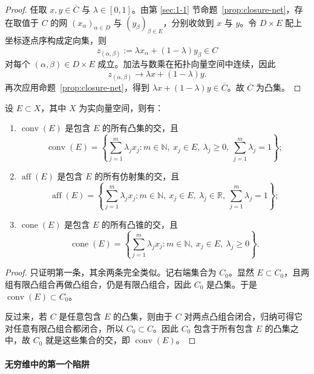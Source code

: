 \begin{proof}
任取 $x,y\in \overline{C}$ 与 $\lambda\in[0,1]$。由第 \ref{sec:1-1} 节命题~\ref{prop:closure-net}，存在取值于 $C$ 的网 $(x_\alpha)_{\alpha\in D}$ 与 $(y_\beta)_{\beta\in E}$，分别收敛到 $x$ 与 $y$。令 $D\times E$ 配上坐标逐点序构成定向集，则
\[
z_{(\alpha,\beta)}:=\lambda x_\alpha+(1-\lambda)y_\beta\in C
\]
对每个 $(\alpha,\beta)\in D\times E$ 成立。加法与数乘在拓扑向量空间中连续，因此
\[
z_{(\alpha,\beta)}\to \lambda x+(1-\lambda)y.
\]
再次应用命题~\ref{prop:closure-net}，得到 $\lambda x+(1-\lambda)y\in \overline{C}$。故 $\overline{C}$ 为凸集。
\end{proof}

\begin{proposition}[凸包与仿射包的基本性质]\label{prop:convex-hull-properties}
设 $E\subset X$，其中 $X$ 为实向量空间，则有：
\begin{enumerate}
  \item $\operatorname{conv}(E)$ 是包含 $E$ 的所有凸集的交，且
  \[
  \operatorname{conv}(E)
  =
  \left\{
    \sum_{j=1}^{m}\lambda_j x_j :
    m\in\mathbb N,\ x_j\in E,\ \lambda_j\ge 0,\ \sum_{j=1}^{m}\lambda_j=1
  \right\};
  \]
  \item $\operatorname{aff}(E)$ 是包含 $E$ 的所有仿射集的交，且
  \[
  \operatorname{aff}(E)
  =
  \left\{
    \sum_{j=1}^{m}\lambda_j x_j :
    m\in\mathbb N,\ x_j\in E,\ \lambda_j\in\mathbb R,\ \sum_{j=1}^{m}\lambda_j=1
  \right\};
  \]
  \item $\operatorname{cone}(E)$ 是包含 $E$ 的所有凸锥的交，且
  \[
  \operatorname{cone}(E)
  =
  \left\{
    \sum_{j=1}^{m}\lambda_j x_j :
    m\in\mathbb N,\ x_j\in E,\ \lambda_j\ge 0
  \right\}.
  \]
\end{enumerate}
\end{proposition}

\begin{proof}
只证明第一条，其余两条完全类似。记右端集合为 $C_0$。显然 $E\subset C_0$，且两组有限凸组合再做凸组合，仍是有限凸组合，因此 $C_0$ 是凸集。于是 $\operatorname{conv}(E)\subset C_0$。

反过来，若 $C$ 是任意包含 $E$ 的凸集，则由于 $C$ 对两点凸组合闭合，归纳可得它对任意有限凸组合都闭合，所以 $C_0\subset C$。因此 $C_0$ 包含于所有包含 $E$ 的凸集之中，故 $C_0$ 就是这些集合的交，即 $\operatorname{conv}(E)$。
\end{proof}

\paragraph{无穷维中的第一个陷阱}

